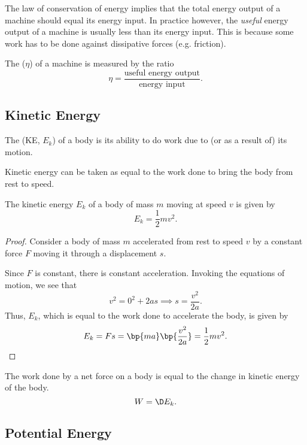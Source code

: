 The law of conservation of energy implies that the total energy output of a machine should equal its energy input. In practice however, the \emph{useful} energy output of a machine is usually less than its energy input. This is because some work has to be done against dissipative forces (e.g. friction).

\begin{definition}
    The  ($\eta$) of a machine is measured by the ratio \[\eta = \frac{\text{useful energy output}}{\text{energy input}}.\]
\end{definition}

\subsection{Kinetic Energy}

\begin{definition}
    The  (KE, $E_k$) of a body is its ability to do work due to (or as a result of) its motion.
\end{definition}

Kinetic energy can be taken as equal to the work done to bring the body from rest to speed.

\begin{proposition}
    The kinetic energy $E_k$ of a body of mass $m$ moving at speed $v$ is given by \[E_k = \frac12 mv^2.\]
\end{proposition}
\begin{proof}
    Consider a body of mass $m$ accelerated from rest to speed $v$ by a constant force $F$ moving it through a displacement $s$.

    Since $F$ is constant, there is constant acceleration. Invoking the equations of motion, we see that \[v^2 = 0^2 + 2as \implies s = \frac{v^2}{2a}.\] Thus, $E_k$, which is equal to the work done to accelerate the body, is given by \[E_k = Fs = \bp{ma}\bp{\frac{v^2}{2a}} = \frac12 mv^2.\]
\end{proof}

\begin{theorem}
    The work done by a net force on a body is equal to the change in kinetic energy of the body. \[W = \D E_k.\]
\end{theorem}

\subsection{Potential Energy}

